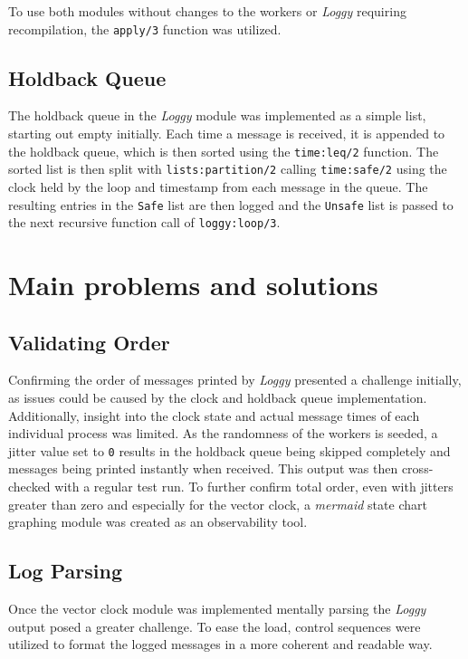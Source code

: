 \documentclass[a4paper, 11pt]{article}
\begin{document}
To use both modules without changes to the workers or \textit{Loggy} requiring recompilation, the \texttt{apply/3} function was utilized.

\subsection{Holdback Queue}

The holdback queue in the \textit{Loggy} module was implemented as a simple list, starting out empty initially.
Each time a message is received, it is appended to the holdback queue, which is then sorted using the \texttt{time:leq/2} function.
The sorted list is then split with \texttt{lists:partition/2} calling \texttt{time:safe/2} using the clock held by the loop and timestamp from each message in the queue.
The resulting entries in the \texttt{Safe} list are then logged and the \texttt{Unsafe} list is passed to the next recursive function call of \texttt{loggy:loop/3}.


\section{Main problems and solutions}

\subsection{Validating Order}

Confirming the order of messages printed by \textit{Loggy} presented a challenge initially, as issues could be caused by the clock and holdback queue implementation. Additionally, insight into the clock state and actual message times of each individual process was limited. 
As the randomness of the workers is seeded, a jitter value set to \texttt{0} results in the holdback queue being skipped completely and messages being printed instantly when received. This output was then cross-checked with a regular test run.
To further confirm total order, even with jitters greater than zero and especially for the vector clock, a \textit{mermaid} state chart graphing module was created as an observability tool. 

\subsection{Log Parsing}
Once the vector clock module was implemented mentally parsing the \textit{Loggy} output posed a greater challenge.
To ease the load, control sequences were utilized to format the logged messages in a more coherent and readable way.
\end{document}
